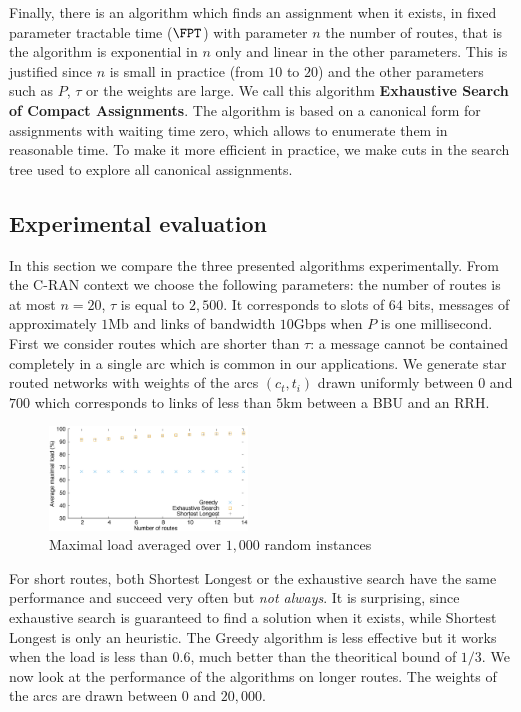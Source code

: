 \documentclass[10pt, conference, letterpaper]{IEEEtran}
\begin{document}
Finally, there is an algorithm which finds an assignment when it exists, in fixed parameter tractable time ($\FPT$) with parameter $n$ the number of routes, that is the algorithm is exponential in $n$ only and linear in the other parameters. This is justified since $n$ is small in practice (from $10$ to $20$) and the other parameters such as $P$, $\tau$ or the weights are large. We call this algorithm \textbf{Exhaustive Search of Compact Assignments}. The algorithm is based on a canonical form for assignments with waiting time zero, which allows to enumerate them in reasonable time. To make it more efficient in practice, we make cuts in the search tree used to explore all canonical assignments. 

   \subsection{Experimental evaluation}\label{sec:exp_PAZL}
   
   In this section we compare the three presented algorithms experimentally. From the C-RAN context we choose the following parameters: the number of routes is at most $n = 20$, $\tau$ is equal to $2,500$. It corresponds to slots of $64$ bits, messages of approximately $1$Mb and links of bandwidth $10$Gbps when $P$ is one millisecond.       
      First we consider routes which are shorter than $\tau$: a message cannot be contained completely in a single arc which is common in our applications. We generate star routed networks with weights of the arcs $(c_t,t_i)$ drawn uniformly between $0$ and $700$ which corresponds to links of less than $5$km between a BBU and an RRH. 

        
      \begin{figure}[h]
      \begin{center}
	 \includegraphics[width=0.47\textwidth]{periode_petite.eps}
      \end{center}
      \caption{Maximal load averaged over $1,000$ random instances}\label{fig:short}
      \end{figure}
      
      
      For short routes, both  Shortest Longest or the exhaustive search have the same performance and succeed very often but \emph{not always}. It is surprising, since exhaustive search is guaranteed to find a solution when it exists, while Shortest Longest is only an heuristic. The Greedy algorithm is less effective but it works when the load is less than $0.6$, much better than the theoritical bound of $1/3$. We now look at the performance of the algorithms on longer routes. The weights of the arcs are drawn between $0$ and $20,000$.
\end{document}

